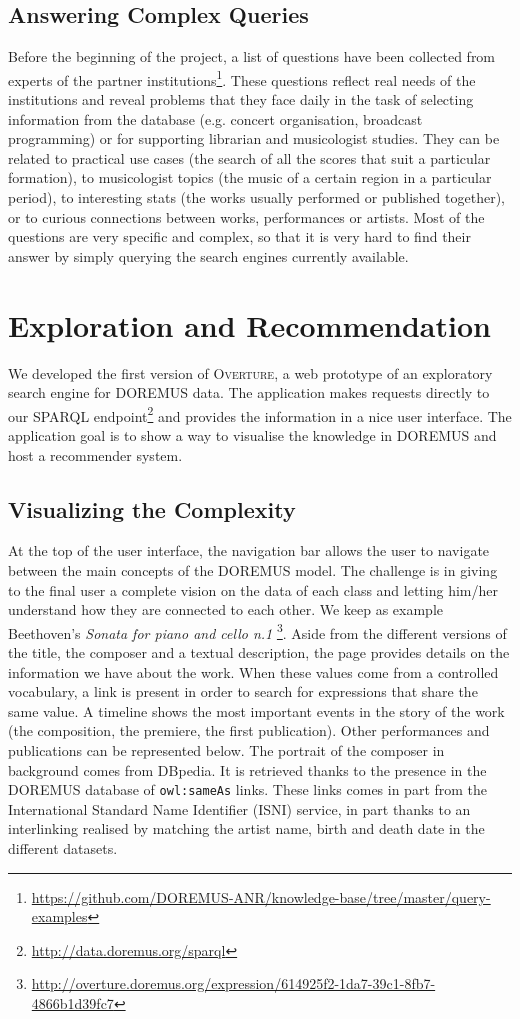 \subsection{Answering Complex Queries}
Before the beginning of the project, a list of questions have been collected from experts of the partner institutions\footnote{\url{https://github.com/DOREMUS-ANR/knowledge-base/tree/master/query-examples}}. These questions reflect real needs of the institutions and reveal problems that they face daily in the task of selecting information from the database (e.g. concert organisation, broadcast programming) or for supporting librarian and musicologist studies. They can be related to practical use cases (the search of all the scores that suit a particular formation), to musicologist topics (the music of a certain region in a particular period), to interesting stats (the works usually performed or published together), or to curious connections between works, performances or artists. Most of the questions are very specific and complex, so that it is very hard to find their answer by simply querying the search engines currently available.

\section{Exploration and Recommendation}\label{sec:explore}
We developed the first version of \textsc{Overture}, a web prototype of an exploratory search engine for DOREMUS data. The application makes requests directly to our SPARQL endpoint\footnote{\url{http://data.doremus.org/sparql}} and provides the information in a nice user interface. The application goal is to show a way to visualise the knowledge in DOREMUS and host a recommender system.

\subsection{Visualizing the Complexity}
At the top of the user interface, the navigation bar allows the user to navigate between the main concepts of the DOREMUS model. The challenge is in giving to the final user a complete vision on the data of each class and letting him/her understand how they are connected to each other.
We keep as example Beethoven's \textit{Sonata for piano and cello n.1} \footnote{\url{http://overture.doremus.org/expression/614925f2-1da7-39c1-8fb7-4866b1d39fc7}}. Aside from the different versions of the title, the composer and a textual description, the page provides details on the information we have about the work. When these values come from a controlled vocabulary, a link is present in order to search for expressions that share the same value. A timeline shows the most important events in the story of the work (the composition, the premiere, the first publication). Other performances and publications can be represented below. The portrait of the composer in background comes from DBpedia. It is retrieved thanks to the presence in the DOREMUS database of \texttt{owl:sameAs} links. These links comes in part from the International Standard Name Identifier (ISNI) service, in part thanks to an interlinking realised by matching the artist name, birth and death date in the different datasets.

